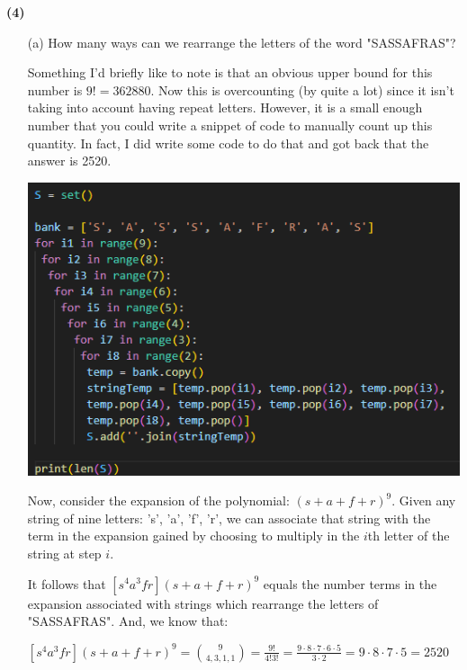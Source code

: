 \documentclass{book}
\newcommand{\exOne}{%
   \color{Purple}%
   \fontsize{13}{15}\selectfont%
}
\newcommand{\exP}{%
   \color{Purple}%
   \fontsize{12}{14}\selectfont%
}
\newenvironment{myIndent}{%
   \begin{adjustwidth}{2.5em}{0em}%
}{%
   \end{adjustwidth}%
}
\newcommand{\blab}[1]{\textbf{#1}}
\newcommand{\retTwo}{\hfill\bigbreak}
\begin{document}
\blab{(4)}
\begin{enumerate}
   \item[(a)] How many ways can we rearrange the letters of the word "SASSAFRAS"?
   
   \begin{myIndent}\exOne
      Something I'd briefly like to note is that an obvious upper bound for this\\ number is $9! = 362880$. Now this is overcounting (by quite a lot) since it isn't taking into account having repeat letters. However, it is a small enough\\ number that you could write a snippet of code to manually count up this\\ quantity. In fact, I did write some code to do that and got back that the answer is 2520.\retTwo

      {\centering\includegraphics[scale=0.75]{188-HW2_Q4a.png}\retTwo\par}

      Now, consider the expansion of the polynomial: $(s + a + f + r)^9$. Given any string of nine letters: 's', 'a', 'f', 'r', we can associate that string with the term in the expansion gained by choosing to multiply in the $i$th letter of the string at step $i$.\retTwo

      It follows that $[s^4a^3fr](s + a + f + r)^9$ equals the number terms in the expansion associated with strings which rearrange the letters of "SASSAFRAS". And, we know that:

      {\centering\exP $[s^4a^3fr](s + a + f + r)^9 = \binom{9}{4, 3, 1, 1} = \frac{9!}{4!3!} = \frac{9\cdot 8 \cdot 7 \cdot 6 \cdot 5}{3 \cdot 2} = 9\cdot 8\cdot 7 \cdot 5 = 2520$ \newpage\par}
   \end{myIndent}


\end{enumerate}
\end{document}
